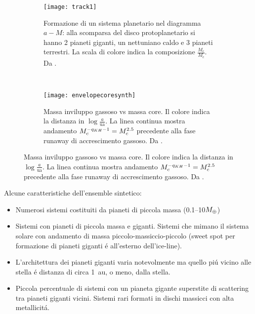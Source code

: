 \begin{figure}[!ht]
\begin{subfigure}[b]{0.47\textwidth}
\centering
\texttt{[image: track1]}
\caption{Formazione di un sistema planetario nel diagramma $a-M$: alla scomparsa del disco protoplanetario si hanno 2 pianeti giganti, un nettuniano caldo e 3 pianeti terrestri. La scala di colore indica la composizione $\frac{M_e}{M_c}$. Da \cite{mordasini2018planetary}.}\label{fig:track1}
\end{subfigure}
~
\begin{subfigure}[b]{0.47\textwidth}
\centering
\texttt{[image: envelopecoresynth]}
\caption{Massa inviluppo gassoso vs massa core. Il colore indica la distanza in $\log{\frac{a}{\si{\astronomicalunit}}}$. La linea continua mostra andamento $M_c^{-q_{KH}-1}=M_c^{2.5}$ precedente alla fase runaway di accrescimento gassoso. Da \cite{mordasini2018planetary}. }\label{fig:envelopecoresynth}
\end{subfigure}
\end{figure}

Alcune caratteristiche dell'ensemble sintetico: %
\begin{itemize}
\item Numerosi sistemi costituiti da pianeti di piccola massa (\numrange{0.1}{10}$M_{\oplus}{}$)
\item Sistemi con pianeti di piccola massa e giganti. Sistemi che mimano il sistema solare con andamento di massa piccolo-massiccio-piccolo (sweet spot per formazione di pianeti giganti \'e all'esterno dell'ice-line).
\item L'architettura dei pianeti giganti varia notevolmente ma quello pi\'u vicino alle stella \'e distanza di circa \SI{1}{\astronomicalunit}, o meno, dalla stella.
\item Piccola percentuale di sistemi con un pianeta gigante superstite di scattering tra pianeti giganti vicini. Sistemi rari formati in dischi massicci con alta metallicit\'a.
\end{itemize}

